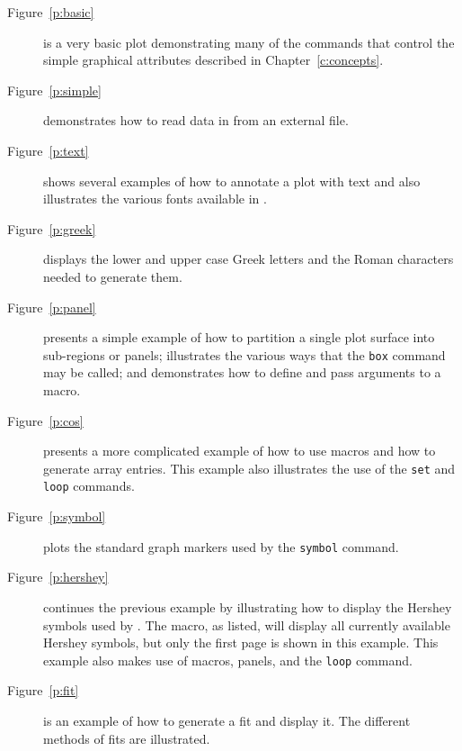 \begin{description}
  \item[Figure~\ref{p:basic}] is a very basic plot demonstrating many of the
    commands that control the simple graphical attributes described
    in Chapter~\ref{c:concepts}.

  \item[Figure~\ref{p:simple}] demonstrates how to read data in from
    an external file.

  \item[Figure~\ref{p:text}] shows several examples of how to annotate a plot
    with text and also illustrates the various fonts available in \wip.

  \item[Figure~\ref{p:greek}] displays the lower and upper case Greek letters
    and the Roman characters needed to generate them.

  \item[Figure~\ref{p:panel}] presents a simple example of how to partition
    a single plot surface into sub-regions or panels;
    illustrates the various ways that the
    {\tt box}
    command may be called;
    and demonstrates how to define and pass arguments to a macro.

  \item[Figure~\ref{p:cos}] presents a more complicated example of how to use
    macros and how to generate array entries.
    This example also illustrates the use of the {\tt set} and {\tt loop}
    commands.

  \item[Figure~\ref{p:symbol}] plots the
    standard graph markers used by the
    {\tt symbol} command.

  \item[Figure~\ref{p:hershey}] continues
    the previous example by illustrating how to display the Hershey
    symbols used by \wip.  The macro, as listed, will display all
    currently available Hershey symbols, but only the first page is shown
    in this example.
    This example also makes use of macros,
    panels, and the
    {\tt loop} command.

  \item[Figure~\ref{p:fit}] is an example of how to generate a fit
    and display it.  The different methods of fits are illustrated.


\end{description}

